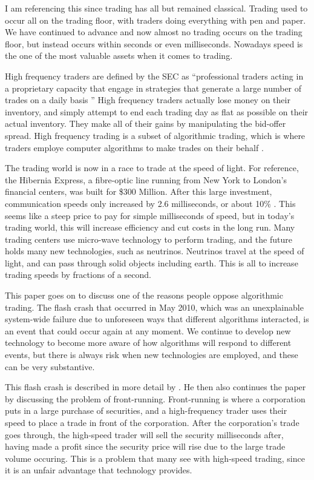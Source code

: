 \documentclass[11pt,]{article}
\begin{document}
I am referencing this since trading has all but remained classical.
Trading used to occur all on the trading floor, with traders doing
everything with pen and paper. We have continued to advance and now
almost no trading occurs on the trading floor, but instead occurs within
seconds or even milliseconds. Nowadays speed is the one of the most
valuable assets when it comes to trading.

High frequency traders are defined by the SEC as ``professional traders
acting in a proprietary capacity that engage in strategies that generate
a large number of trades on a daily basis \citet{menkveld2013high}''
High frequency traders actually lose money on their inventory, and
simply attempt to end each trading day as flat as possible on their
actual inventory. They make all of their gains by manipulating the
bid-offer spread. High frequency trading is a subset of algorithmic
trading, which is where traders employe computer algorithms to make
trades on their behalf \citet{zhang2010high}.

The trading world is now in a race to trade at the speed of light. For
reference, the Hibernia Express, a fibre-optic line running from New
York to London's financial centers, was built for \$300 Million. After
this large investment, communication speeds only increased by 2.6
milliseconds, or about 10\% \citet{buchanan2015trading}. This seems like
a steep price to pay for simple milliseconds of speed, but in today's
trading world, this will increase efficiency and cut costs in the long
run. Many trading centers use micro-wave technology to perform trading,
and the future holds many new technologies, such as neutrinos. Neutrinos
travel at the speed of light, and can pass through solid objects
including earth. This is all to increase trading speeds by fractions of
a second.

This paper goes on to discuss one of the reasons people oppose
algorithmic trading. The flash crash that occurred in May 2010, which
was an unexplainable system-wide failure due to unforeseen ways that
different algorithms interacted, is an event that could occur again at
any moment. We continue to develop new technology to become more aware
of how algorithms will respond to different events, but there is always
risk when new technologies are employed, and these can be very
substantive.

This flash crash is described in more detail by
\citet{vuorenmaa2013good}. He then also continues the paper by
discussing the problem of front-running. Front-running is where a
corporation puts in a large purchase of securities, and a high-frequency
trader uses their speed to place a trade in front of the corporation.
After the corporation's trade goes through, the high-speed trader will
sell the security milliseconds after, having made a profit since the
security price will rise due to the large trade volume occuring. This is
a problem that many see with high-speed trading, since it is an unfair
advantage that technology provides.
\end{document}
